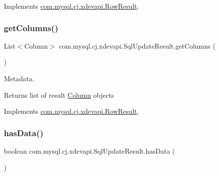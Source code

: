 Implements \mbox{\hyperlink{interfacecom_1_1mysql_1_1cj_1_1xdevapi_1_1_row_result_acbc412c859e4618f3b924c602a82f541}{com.\+mysql.\+cj.\+xdevapi.\+Row\+Result}}.

\mbox{\label{classcom_1_1mysql_1_1cj_1_1xdevapi_1_1_sql_update_result_a229524cce1f3a1157e52d8f3d7b9dfc1}} 
\subsubsection{\texorpdfstring{get\+Columns()}{getColumns()}}
{\footnotesize\ttfamily List$<$Column$>$ com.\+mysql.\+cj.\+xdevapi.\+Sql\+Update\+Result.\+get\+Columns (\begin{DoxyParamCaption}{ }\end{DoxyParamCaption})}

Metadata.

\begin{DoxyReturn}{Returns}
list of result \mbox{\hyperlink{interfacecom_1_1mysql_1_1cj_1_1xdevapi_1_1_column}{Column}} objects 
\end{DoxyReturn}


Implements \mbox{\hyperlink{interfacecom_1_1mysql_1_1cj_1_1xdevapi_1_1_row_result_a4bd495dadd5549516c0f32366f8d77c7}{com.\+mysql.\+cj.\+xdevapi.\+Row\+Result}}.

\mbox{\label{classcom_1_1mysql_1_1cj_1_1xdevapi_1_1_sql_update_result_a38bebbec7e0b9049b0d7aef72d7856eb}} 
\subsubsection{\texorpdfstring{has\+Data()}{hasData()}}
{\footnotesize\ttfamily boolean com.\+mysql.\+cj.\+xdevapi.\+Sql\+Update\+Result.\+has\+Data (\begin{DoxyParamCaption}{ }\end{DoxyParamCaption})}

